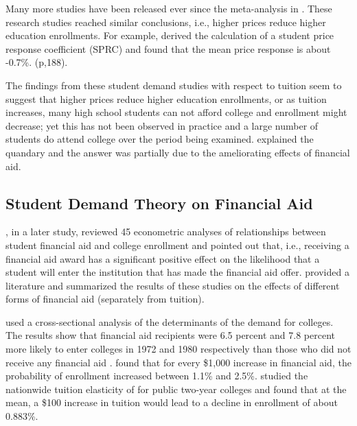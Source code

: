 \documentclass[12pt,english]{report}
\begin{document}
Many more studies have been released ever since the meta-analysis in \citep{Leslie1987}. These research 
studies reached similar conclusions, i.e., higher prices reduce higher education enrollments.  For 
example, \citet{Leslie1987} derived the calculation of a student price response coefficient (SPRC) and 
found that the mean price response is about -0.7\%.   (p,188).

The findings from these student demand studies with respect to tuition seem to suggest that higher prices reduce higher education enrollments, or as tuition increases, many high school students can not afford college and enrollment might decrease; yet this has not been observed in practice and a large number of students do attend college over the period being examined. \citet{Leslie1987} explained the quandary and the answer was partially due to the ameliorating effects of financial aid. 

\subsection{Student Demand Theory on Financial Aid}
\citet{Leslie1988}, in a later study, reviewed 45 econometric analyses of relationships between student financial aid and college enrollment and pointed out that, i.e., receiving a financial aid award has a significant positive effect on the likelihood that a student will enter the institution that has made the financial aid offer. \citet{Heller1997} provided a literature and summarized the results of these studies on the effects of different forms of financial aid (separately from tuition). 

\citet{JACKSON198815} used a cross-sectional analysis of the determinants of the demand for colleges.  The results show that financial aid recipients were 6.5 percent and 7.8 percent more likely to enter colleges in 1972 and 1980 respectively than those who did not receive any financial aid . \citet{Braunstein1999} found that for every \$1,000 increase in financial aid, the probability of enrollment increased between 1.1\% and 2.5\%. \citet{Crouse2015} studied the nationwide tuition elasticity of for public two-year colleges and found that at the mean, a \$100 increase in tuition would lead to a decline in enrollment of about 0.883\%.
\end{document}
